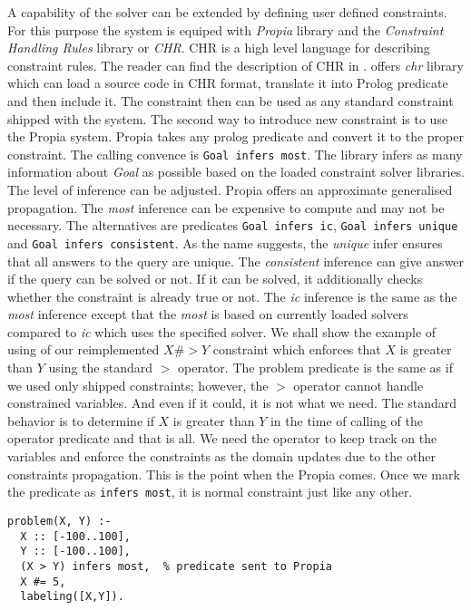 A capability of the solver can be extended by defining user defined constraints. For this
purpose the system is equiped with {\em Propia} library and the {\em Constraint Handling Rules}
library or {\em CHR}. CHR is a high level language for describing constraint rules. The reader can find
the description of CHR in \cite{chr:website}.
\eclipse offers {\em chr} library which can load a source code in CHR format, translate it
into Prolog predicate and then include it. The constraint then can be used as any standard
constraint shipped with the system.
The second way to introduce new constraint is to use the Propia system. Propia takes 
any prolog predicate and convert it to the proper constraint.
The calling convence is \texttt{Goal infers most}. The library infers as many information about {\em Goal} 
as possible based on the loaded constraint solver libraries. The level of inference can be adjusted.
Propia offers an approximate generalised propagation. The {\em most} inference can be expensive 
to compute and may not be necessary. The alternatives are predicates \texttt{Goal infers ic}, 
\texttt{Goal infers unique} and \texttt{Goal infers consistent}. As the name suggests, the {\em unique} 
infer ensures that all answers to the query are unique. The {\em consistent} inference can give
answer if the query can be solved or not. If it can be solved, it additionally checks whether the
constraint is already true or not. The {\em ic} inference is the same as the {\em most} inference except that
the {\em most} is based on currently loaded solvers compared to {\em ic} which uses the specified solver.
We shall show the example of using of our reimplemented $X \#> Y$ constraint which 
enforces that $X$ is greater than $Y$ using the standard $>$ operator. The problem predicate is the same 
as if we used only shipped constraints; however, the $>$ operator cannot handle constrained
variables. And even if it could, it is not what we need. The standard behavior is to 
determine if $X$ is greater than $Y$ in the time of calling of the operator predicate and
that is all. We need the operator to keep track on the variables and enforce the constraints
as the domain updates due to the other constraints propagation. This is the point when the Propia
comes. Once we mark the predicate as \texttt{infers most}, it is normal
constraint just like any other.

\begin{verbatim}
problem(X, Y) :-
  X :: [-100..100], 
  Y :: [-100..100], 
  (X > Y) infers most,  % predicate sent to Propia   
  X #= 5, 
  labeling([X,Y]).
\end{verbatim}

